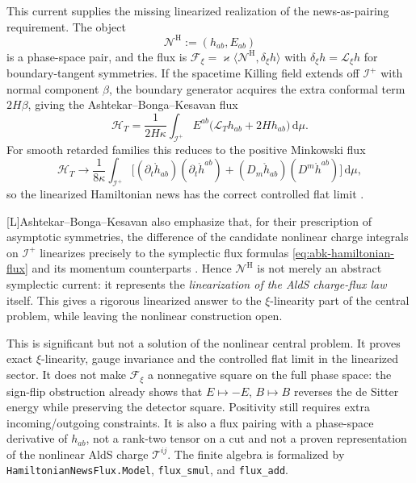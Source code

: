 \documentclass[11pt,a4paper]{article}
\newcommand{\cT}{\mathcal{T}}
\newcommand{\cN}{\mathcal{N}}
\newcommand{\diff}{\mathrm{d}}
\newcommand{\statusL}{\textsf{[L]}}
\begin{document}
This current supplies the missing linearized realization of the news-as-pairing requirement.  The object
\begin{equation}\label{eq:hamiltonian-news-pair}
  \cN^{\mathrm H}:=(h_{ab},E_{ab})
\end{equation}
is a phase-space pair, and the flux is \(\mathcal F_\xi=\varkappa\langle \cN^{\mathrm H},\delta_\xi h\rangle\) with \(\delta_\xi h=\mathcal L_\xi h\) for boundary-tangent symmetries.  If the spacetime Killing field extends off \(\mathscr I^+\) with normal component \(\beta\), the boundary generator acquires the extra conformal term \(2H\beta\), giving the Ashtekar--Bonga--Kesavan flux \cite{ashtekar2015linear}
\begin{equation}\label{eq:abk-hamiltonian-flux}
  \mathcal H_T
  =
  \frac{1}{2H\kappa}
  \int_{\mathscr I^+}
  E^{ab}\big(\mathcal L_Th_{ab}+2Hh_{ab}\big)\,\diff\mu .
\end{equation}
For smooth retarded families this reduces to the positive Minkowski flux
\begin{equation}
  \mathcal H_T\longrightarrow
  \frac1{8\kappa}
  \int_{\mathscr I^+}
  \Big[
  (\partial_t\mathring h_{ab})(\partial_t\mathring h^{ab})
  +
  (D_m\mathring h_{ab})(D^m\mathring h^{ab})
  \Big]\,\diff\mu ,
\end{equation}
so the linearized Hamiltonian news has the correct controlled flat limit \cite{ashtekar2015linear}.

\statusL Ashtekar--Bonga--Kesavan also emphasize that, for their prescription of asymptotic symmetries, the difference of the candidate nonlinear charge integrals on \(\mathscr I^+\) linearizes precisely to the symplectic flux formulas \eqref{eq:abk-hamiltonian-flux} and its momentum counterparts \cite{ashtekar2015linear}.  Hence \(\cN^{\mathrm H}\) is not merely an abstract symplectic current: it represents the \emph{linearization of the AldS charge-flux law} itself.  This gives a rigorous linearized answer to the \(\xi\)-linearity part of the central problem, while leaving the nonlinear construction open.

This is significant but not a solution of the nonlinear central problem.  It proves exact \(\xi\)-linearity, gauge invariance and the controlled flat limit in the linearized sector.  It does not make \(\mathcal F_\xi\) a nonnegative square on the full phase space: the sign-flip obstruction already shows that \(E\mapsto-E\), \(B\mapsto B\) reverses the de Sitter energy while preserving the detector square.  Positivity still requires extra incoming/outgoing constraints.  It is also a flux pairing with a phase-space derivative of \(h_{ab}\), not a rank-two tensor on a cut and not a proven representation of the nonlinear AldS charge \(\cT^{ij}\).  The finite algebra is formalized by \texttt{HamiltonianNewsFlux.Model}, \texttt{flux\_smul}, and \texttt{flux\_add}.
\end{document}
